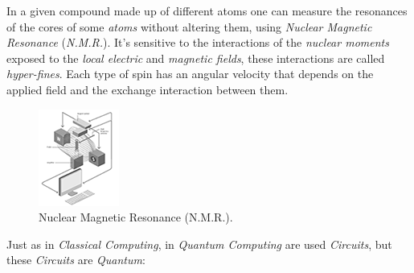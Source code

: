 \documentclass[conference]{IEEEtran}
\begin{document}
\vspace{4pt}

In a given compound made up of different atoms one can measure the resonances of the cores of some \textit{atoms} without altering them, using \textit{Nuclear Magnetic Resonance} (\textit{N.M.R.}). It's sensitive to the interactions of the \textit{nuclear moments} exposed to the \textit{local electric} and \textit{magnetic fields}, these interactions are called \textit{hyper-fines}. Each type of spin has an angular velocity that depends on the applied field and the exchange interaction between them.

\begin{figure}[htbp]
\centerline{\includegraphics{fig3.png}}
\caption{Nuclear Magnetic Resonance (N.M.R.).}
\label{fig}
\end{figure}

\newpage

Just as in \textit{Classical Computing}, in \textit{Quantum Computing} are used \textit{Circuits}, but these \textit{Circuits} are \textit{Quantum}:

\vspace{4pt}
\end{document}
